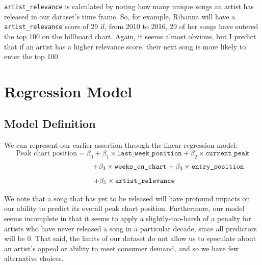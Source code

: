 \documentclass[11pt]{article} %
\begin{document}

\texttt{artist\_relevance} is calculated by noting how many unique songs an artist has released in our dataset's time frame. So, for example, Rihanna will have a \texttt{artist\_relevance} score of 29 if, from 2010 to 2016, 29 of her songs have entered the top 100 on the billboard chart. Again, it seems almost obvious, but I predict that if an artist has a higher relevance score, their next song is more likely to enter the top 100. \par

\section*{Regression Model}

\subsection*{Model Definition}
We can represent our earlier assertion through the linear regression model:
\[ \text{Peak chart position} =  \beta_0 + \beta_1 \times \texttt{last\_week\_position} + \beta_2 \times \texttt{current\_peak} \] 
\[\hspace*{10.1em} + \beta_3 \times \texttt{weeks\_on\_chart} + \beta_4 \times \texttt{entry\_position} \]
\[\hspace*{0.5em} + \beta_5 \times \texttt{artist\_relevance} \]

We note that a song that has yet to be released will have profound impacts on our ability to predict its overall peak chart position. Furthermore, our model seems incomplete in that it seems to apply a slightly-too-harsh of a penalty for artists who have never released a song in a particular decade, since all predictors will be 0. That said, the limits of our dataset do not allow us to speculate about an artist's appeal or ability to meet consumer demand, and so we have few alternative choices.
\end{document}

